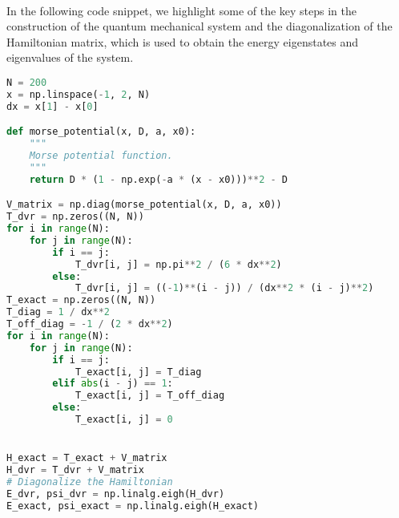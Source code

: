 \documentclass{subfiles}
\begin{document}
\\ 
In the following code snippet, we highlight some of the key steps in the construction of the quantum mechanical system and the diagonalization of the Hamiltonian matrix, which is used to obtain the energy eigenstates and eigenvalues of the system. 
\begin{lstlisting}[language=Python, label=lst:dvr_validation]
N = 200
x = np.linspace(-1, 2, N)
dx = x[1] - x[0]

def morse_potential(x, D, a, x0):
    """
    Morse potential function.
    """
    return D * (1 - np.exp(-a * (x - x0)))**2 - D

V_matrix = np.diag(morse_potential(x, D, a, x0))
T_dvr = np.zeros((N, N))
for i in range(N):
    for j in range(N):
        if i == j:
            T_dvr[i, j] = np.pi**2 / (6 * dx**2)
        else:
            T_dvr[i, j] = ((-1)**(i - j)) / (dx**2 * (i - j)**2)
T_exact = np.zeros((N, N))
T_diag = 1 / dx**2 
T_off_diag = -1 / (2 * dx**2)
for i in range(N):
    for j in range(N):
        if i == j:
            T_exact[i, j] = T_diag
        elif abs(i - j) == 1:
            T_exact[i, j] = T_off_diag
        else:
            T_exact[i, j] = 0


H_exact = T_exact + V_matrix
H_dvr = T_dvr + V_matrix
# Diagonalize the Hamiltonian
E_dvr, psi_dvr = np.linalg.eigh(H_dvr)
E_exact, psi_exact = np.linalg.eigh(H_exact)
\end{lstlisting}
\end{document}
